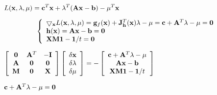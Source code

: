 \documentclass{article}
\def\lthtmlcheckvsize{\ifdim\ht\sizebox<\vsize 
  \ifdim\wd\sizebox<\hsize\expandafter\hfill\fi \expandafter\vfill
  \else\expandafter\vss\fi}%
\begin{document}
{\newpage\clearpage
{}%
$\displaystyle L({\bf x},{\bf\lambda},{\bf\mu})
={\bf c}^T{\bf x}+{\bf\lambda}^T({\bf Ax}-{\bf b})-{\bf\mu}^T{\bf x}$%
\lthtmlindisplaymathZ
\lthtmlcheckvsize\clearpage}

{\newpage\clearpage
{}%
\begin{displaymath}\left\{
\begin{array}{ll}
\bigtriangledown_{\bf x} L({\bf x},{\bf\lambda},{\bf\mu})
={\bf g}_f({\bf x})+{\bf J}_{\bf h}^T({\bf x}){\bf\lambda}-\mu
={\bf c}+{\bf A}^T{\bf\lambda}-{\bf\mu}={\bf0} \\
{\bf h}({\bf x})={\bf Ax}-{\bf b}={\bf0} \nonumber\\
{\bf XM1}-{\bf 1}/t={\bf0}
\end{array}\right.\end{displaymath}%
\lthtmldisplayZ
\lthtmlcheckvsize\clearpage}

{\newpage\clearpage
{}%
$\displaystyle \left[\begin{array}{ccc}
{\bf0} & {\bf A}^T & -{\bf I}\\
{\bf A} & {\bf0} & {\bf0} \\
{\bf M} & {\bf0} & {\bf X}\end{array}\right]
\left[\begin{array}{c}
\delta{\bf x}\\\delta{\bf\lambda}\\\delta{\bf\mu}
\end{array}\right]
=-\left[\begin{array}{c}
{\bf c}+{\bf A}^T{\bf\lambda}-{\bf\mu}\\
{\bf Ax}-{\bf b}\\{\bf XM1}-{\bf 1}/t
\end{array}\right]$%
\lthtmlindisplaymathZ
\lthtmlcheckvsize\clearpage}

{\newpage\clearpage
{}%
$ {\bf c}+{\bf A}^T{\bf\lambda}-{\bf\mu}={\bf0}$%
\lthtmlindisplaymathZ
\lthtmlcheckvsize\clearpage}
\end{document}

